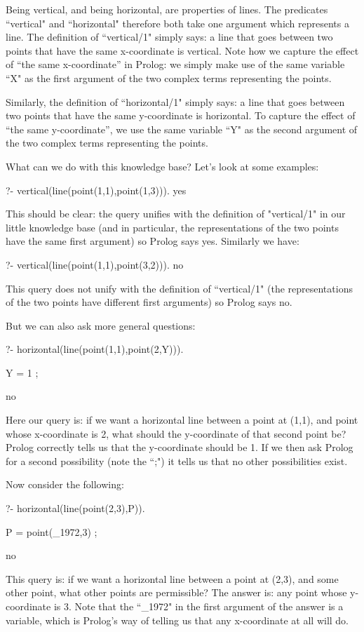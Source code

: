 Being vertical, and being horizontal, are properties of lines. The
predicates ``vertical" and ``horizontal" therefore both take one
argument which represents a line.  The definition of ``vertical/1"
simply says: a line that goes between two points that have the same
x-coordinate is vertical.  Note how we capture the effect of ``the same
x-coordinate'' in Prolog: we simply make use of the same variable ``X"
as the first argument of the two complex terms representing the
points.

Similarly, the definition of ``horizontal/1" simply says: a line that
goes between two points that have the same y-coordinate is horizontal.
To capture the effect of ``the same y-coordinate'', we use the same
variable ``Y" as the second argument of the two complex terms
representing the points.

What can we do with this knowledge base? Let's look at some examples:
\begin{LPNcodedisplay}
?- vertical(line(point(1,1),point(1,3))).
yes
\end{LPNcodedisplay}
%
This should be clear: the query unifies with the definition of
"vertical/1" in our little knowledge base (and in particular, the
representations of the two points have the same first argument) so
Prolog says yes.  Similarly we have:
\begin{LPNcodedisplay}
?- vertical(line(point(1,1),point(3,2))).
no
\end{LPNcodedisplay}
This query does not unify with the definition of ``vertical/1" (the
representations of the two points have different first arguments) so
Prolog says no.

But we can also ask more general questions:
\begin{LPNcodedisplay}
?- horizontal(line(point(1,1),point(2,Y))).

Y = 1 ;

no
\end{LPNcodedisplay}
%
Here our query is: if we want a horizontal line between a point at
(1,1), and point whose x-coordinate is 2, what should the y-coordinate
of that second point be?  Prolog correctly tells us that the
y-coordinate should be 1. If we then ask Prolog for a second
possibility (note the ``;") it tells us that no other possibilities
exist.

Now consider the following:
\begin{LPNcodedisplay}
?- horizontal(line(point(2,3),P)).

P = point(_1972,3) ;

no
\end{LPNcodedisplay}
%
This query is: if we want a horizontal line between a point at (2,3),
and some other point, what other points are permissible?  The answer
is: any point whose y-coordinate is 3. Note that the ``\_1972" in the
first argument of the answer is a variable, which is Prolog's way of
telling us that any x-coordinate at all will do.

